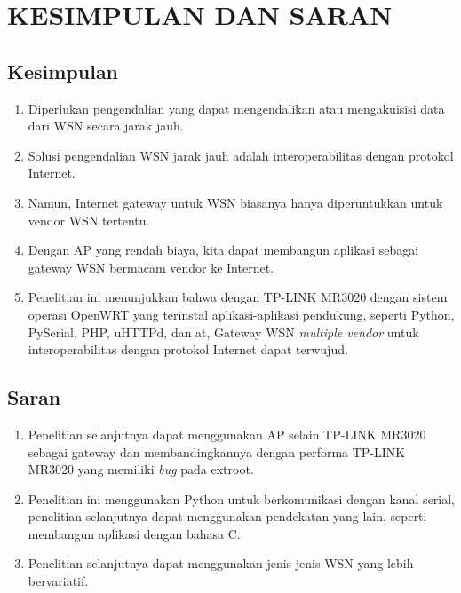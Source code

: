 
\chapter{KESIMPULAN DAN SARAN}

\section{Kesimpulan}
	\begin{enumerate}
		\item Diperlukan pengendalian yang dapat mengendalikan atau mengakuisisi data dari WSN secara jarak jauh.
		\item Solusi pengendalian WSN jarak jauh adalah interoperabilitas dengan protokol Internet.
		\item Namun, Internet gateway untuk WSN biasanya hanya diperuntukkan untuk vendor WSN tertentu.
		\item Dengan AP yang rendah biaya, kita dapat membangun aplikasi sebagai gateway WSN bermacam vendor ke Internet.
		\item Penelitian ini menunjukkan bahwa dengan TP-LINK MR3020 dengan sistem operasi OpenWRT yang terinstal aplikasi-aplikasi pendukung, seperti Python, PySerial, PHP, uHTTPd, dan at, Gateway WSN \emph{multiple vendor} untuk interoperabilitas dengan protokol Internet dapat terwujud.
	\end{enumerate}


\section{Saran}
	\begin{enumerate}
		\item Penelitian selanjutnya dapat menggunakan AP selain TP-LINK MR3020 sebagai gateway dan membandingkannya dengan performa TP-LINK MR3020 yang memiliki \emph{bug} pada extroot.
		\item Penelitian ini menggunakan Python untuk berkomunikasi dengan kanal serial, penelitian selanjutnya dapat menggunakan pendekatan yang lain, seperti membangun aplikasi dengan bahasa C.
		\item Penelitian selanjutnya dapat menggunakan jenis-jenis WSN yang lebih bervariatif.
	\end{enumerate}

	
\begin{comment}

\end{comment}
